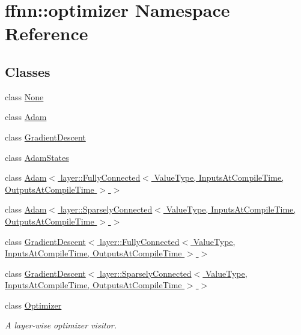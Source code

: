 \hypertarget{namespaceffnn_1_1optimizer}{\section{ffnn\-:\-:optimizer Namespace Reference}
\label{namespaceffnn_1_1optimizer}
}
\subsection*{Classes}
\begin{DoxyCompactItemize}
\item 
class \hyperlink{classffnn_1_1optimizer_1_1_none}{None}
\item 
class \hyperlink{classffnn_1_1optimizer_1_1_adam}{Adam}
\item 
class \hyperlink{classffnn_1_1optimizer_1_1_gradient_descent}{Gradient\-Descent}
\item 
class \hyperlink{classffnn_1_1optimizer_1_1_adam_states}{Adam\-States}
\item 
class \hyperlink{classffnn_1_1optimizer_1_1_adam_3_01layer_1_1_fully_connected_3_01_value_type_00_01_inputs_at_co08ce471fd3ee7441a350cc42cfd35bcd}{Adam$<$ layer\-::\-Fully\-Connected$<$ Value\-Type, Inputs\-At\-Compile\-Time, Outputs\-At\-Compile\-Time $>$ $>$}
\item 
class \hyperlink{classffnn_1_1optimizer_1_1_adam_3_01layer_1_1_sparsely_connected_3_01_value_type_00_01_inputs_at5101e46d32858ec2169acdeede08d723}{Adam$<$ layer\-::\-Sparsely\-Connected$<$ Value\-Type, Inputs\-At\-Compile\-Time, Outputs\-At\-Compile\-Time $>$ $>$}
\item 
class \hyperlink{classffnn_1_1optimizer_1_1_gradient_descent_3_01layer_1_1_fully_connected_3_01_value_type_00_01_5f7b01db2ae4d39760d70ee323649a60}{Gradient\-Descent$<$ layer\-::\-Fully\-Connected$<$ Value\-Type, Inputs\-At\-Compile\-Time, Outputs\-At\-Compile\-Time $>$ $>$}
\item 
class \hyperlink{classffnn_1_1optimizer_1_1_gradient_descent_3_01layer_1_1_sparsely_connected_3_01_value_type_00_e6c27913ab0d90f52f73031aa88c19bf}{Gradient\-Descent$<$ layer\-::\-Sparsely\-Connected$<$ Value\-Type, Inputs\-At\-Compile\-Time, Outputs\-At\-Compile\-Time $>$ $>$}
\item 
class \hyperlink{classffnn_1_1optimizer_1_1_optimizer}{Optimizer}
\begin{DoxyCompactList}\small\item\em A layer-\/wise optimizer visitor. \end{DoxyCompactList}\end{DoxyCompactItemize}
